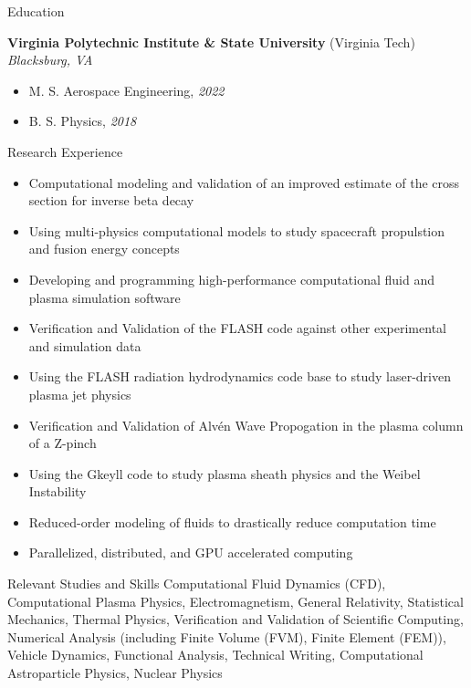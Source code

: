 \documentclass{resume} %
\begin{document}
\begin{rSection}{Education}

    \textbf{Virginia Polytechnic Institute \& State University} (Virginia Tech) \hfill \textit{Blacksburg, VA}
     \begin{itemize}
        \itemsep -3pt {} 
         \item M. S. Aerospace Engineering, \textit{2022}
         \item B. S. Physics, \textit{2018}
     \end{itemize}


\end{rSection}

\begin{rSection}{Research Experience}
    \begin{itemize}
        \itemsep -3pt {}
        \item Computational modeling and validation of an improved estimate of the cross section for inverse beta decay
        \item Using multi-physics computational models to study spacecraft propulstion and fusion energy concepts
        \item Developing and programming high-performance computational fluid and plasma simulation software
        \item Verification and Validation of the FLASH code against other experimental and simulation data
        \item Using the FLASH radiation hydrodynamics code base to study laser-driven plasma jet physics
        \item Verification and Validation of Alv\'en Wave Propogation in the plasma column of a Z-pinch
        \item Using the Gkeyll code to study plasma sheath physics and the Weibel Instability
        \item Reduced-order modeling of fluids to drastically reduce computation time
        \item Parallelized, distributed, and GPU accelerated computing
    \end{itemize}
\end{rSection}

\begin{rSection}{Relevant Studies and Skills}
    Computational Fluid Dynamics (CFD), Computational Plasma Physics, Electromagnetism, General Relativity, Statistical Mechanics, Thermal Physics, Verification and Validation of Scientific Computing, Numerical Analysis (including Finite Volume (FVM), Finite Element (FEM)), Vehicle Dynamics, Functional Analysis, Technical Writing, Computational Astroparticle Physics, Nuclear Physics
\end{rSection}
\end{document}
